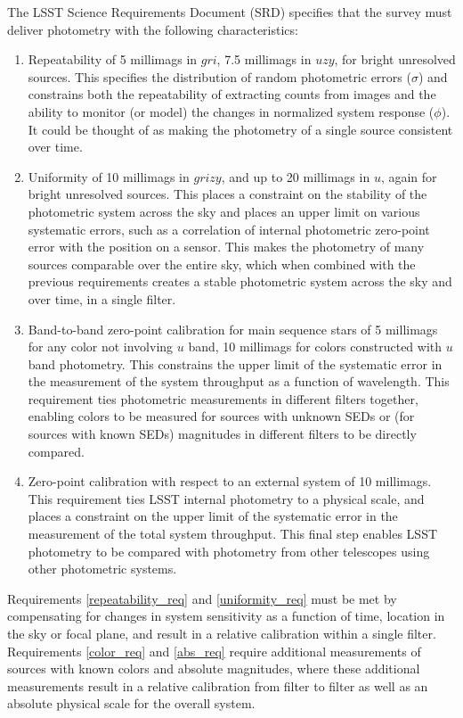 \documentclass[12pt,preprint]{aastex}
\begin{document}
The LSST Science Requirements Document (SRD) specifies that the survey
must deliver photometry with the following characteristics:
\begin{enumerate}
\item{Repeatability of 5 millimags in $gri$, 7.5 millimags in $uzy$,
for bright unresolved sources.  This specifies the distribution of
random photometric errors ($\sigma$) and constrains both the
repeatability of extracting counts from images and the ability to
monitor (or model) the changes in normalized system response
($\phi$). It could be thought of as making the photometry of a single
source consistent over time. \label{repeatability_req}}
\item{Uniformity of 10 millimags in $grizy$, and up to 20 millimags in
$u$, again for bright unresolved sources. This places a constraint on
the stability of the photometric system across the sky and places an
upper limit on various systematic errors, such as a correlation of
internal photometric zero-point error with the position on a
sensor. This makes the photometry of many sources comparable over the
entire sky, which when combined with the previous requirements creates
a stable photometric system across the sky and over time, in a single
filter. \label{uniformity_req}}
\item{Band-to-band zero-point calibration for main sequence stars of 5
millimags for any color not involving $u$ band, 10 millimags for
colors constructed with $u$ band photometry. This constrains the upper
limit of the systematic error in the measurement of the system
throughput as a function of wavelength. This requirement ties
photometric measurements in different filters together, enabling
colors to be measured for sources with unknown SEDs or (for sources
with known SEDs) magnitudes in different filters to be directly
compared. \label{color_req}}
\item{Zero-point calibration with respect to an external system of 10
millimags. This requirement ties LSST internal photometry to a
physical scale, and places a constraint on the upper limit of the
systematic error in the measurement of the total system
throughput. This final step enables LSST photometry to be compared
with photometry from other telescopes using other photometric
systems. \label{abs_req}}
\end{enumerate}

Requirements \ref{repeatability_req} and \ref{uniformity_req} must be
met by compensating for changes in system sensitivity as a function of
time, location in the sky or focal plane, and result in a relative
calibration within a single filter. Requirements \ref{color_req}
and \ref{abs_req} require additional measurements of sources with
known colors and absolute magnitudes, where these additional
measurements result in a relative calibration from filter to filter as
well as an absolute physical scale for the overall system.
\end{document}
